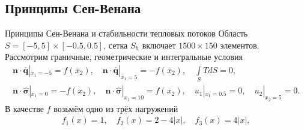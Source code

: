 \subsection{Принципы Сен-Венана}
\begin{frame}{Принципы Сен-Венана и стабильности тепловых потоков}
\justifying
Область $S = [-5, 5] \times [-0.5, 0.5]$, сетка $S_h$ включает $1500 \times 150$ элементов.\\
Рассмотрим граничные, геометрические и интегральные условия
\begin{gather*}
	\boldsymbol{n} \cdot \overline{\boldsymbol{q}} |_{\overline{x}_1 = -5} = f(\overline{x}_2),
	\quad
	\boldsymbol{n} \cdot \overline{\boldsymbol{q}} |_{\overline{x}_1 = 5} = -f(\overline{x}_2),
	\quad
	\int\limits_S T dS = 0, \\
	\boldsymbol{n} \cdot \widehat{\boldsymbol{\sigma}} |_{x_1 = 0} = -f(x_2),
	\quad
	\boldsymbol{n} \cdot \widehat{\boldsymbol{\sigma}} |_{x_1 = 10} = f(x_2),
	\quad
	u_1 |_{x_1 = 0.5} = 0,
	\quad
	u_2 |_{x_2 = 5} = 0.
\end{gather*}
В качестве $f$ возьмём одно из трёх нагружений
\begin{gather*}
	f_1 (x) = 1,
	\quad
	f_2 (x) = 2 - 4 |x|,
	\quad
	f_3 (x) = 4 |x|,
\end{gather*}


\end{frame}
